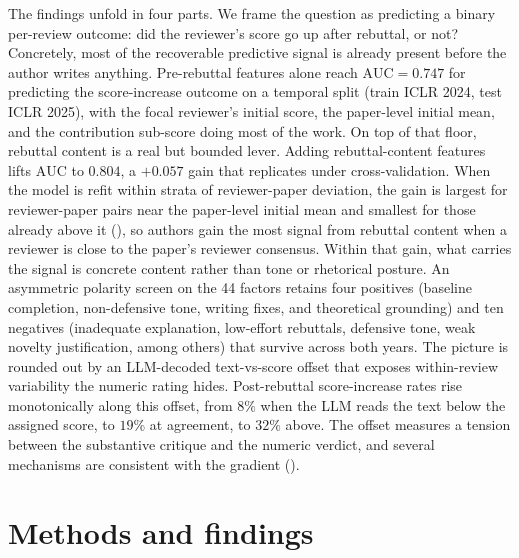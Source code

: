 \documentclass{article}
\newcommand{\auc}{\text{AUC}}
\begin{document}
The findings unfold in four parts. We frame the question as predicting a binary per-review outcome: did the reviewer's score go up after rebuttal, or not? Concretely, most of the recoverable predictive signal is already present before the author writes anything. Pre-rebuttal features alone reach $\auc = 0.747$ for predicting the score-increase outcome on a temporal split (train ICLR 2024, test ICLR 2025), with the focal reviewer's initial score, the paper-level initial mean, and the contribution sub-score doing most of the work. On top of that floor, rebuttal content is a real but bounded lever. Adding rebuttal-content features lifts $\auc$ to $0.804$, a $+0.057$ gain that replicates under cross-validation. When the model is refit within strata of reviewer-paper deviation, the gain is largest for reviewer-paper pairs near the paper-level initial mean and smallest for those already above it (), so authors gain the most signal from rebuttal content when a reviewer is close to the paper's reviewer consensus. Within that gain, what carries the signal is concrete content rather than tone or rhetorical posture. An asymmetric polarity screen on the 44 factors retains four positives (baseline completion, non-defensive tone, writing fixes, and theoretical grounding) and ten negatives (inadequate explanation, low-effort rebuttals, defensive tone, weak novelty justification, among others) that survive across both years. The picture is rounded out by an LLM-decoded text-vs-score offset that exposes within-review variability the numeric rating hides. Post-rebuttal score-increase rates rise monotonically along this offset, from $8\%$ when the LLM reads the text below the assigned score, to $19\%$ at agreement, to $32\%$ above. The offset measures a tension between the substantive critique and the numeric verdict, and several mechanisms are consistent with the gradient ().

\section{Methods and findings}\label{sec:results}
\end{document}
